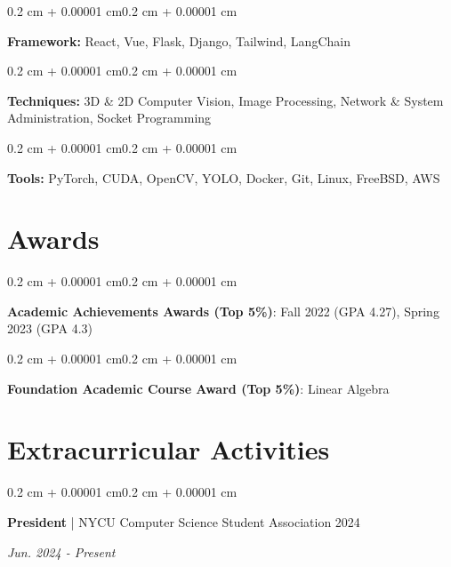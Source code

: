 \documentclass[10pt, letterpaper]{article}
\newenvironment{highlights}{
    \begin{itemize}[
        topsep=0.05 cm,
        parsep=0.05 cm,
        partopsep=0pt,
        itemsep=0pt,
        leftmargin=0.4 cm + 10pt
    ]
}{
    \end{itemize}
}
\newenvironment{onecolentry}{
    \begin{adjustwidth}{0.2 cm + 0.00001 cm}{0.2 cm + 0.00001 cm}
}{
    \end{adjustwidth}
}
\newenvironment{twocolentry}[2][]{
    \onecolentry
    \def\secondColumn{#2}
    \setcolumnwidth{\fill, 4.5 cm}
    \begin{paracol}{2}
}{
    \switchcolumn \raggedleft \secondColumn
    \end{paracol}
    \endonecolentry
}
\begin{document}
        \vspace{0.15 cm}
        \begin{onecolentry}
            \textbf{Framework:} React, Vue, Flask, Django, Tailwind, LangChain
        \end{onecolentry}
        
        \vspace{0.15 cm}
        \begin{onecolentry}
            \textbf{Techniques:} 3D \& 2D Computer Vision, Image Processing, Network \& System Administration, Socket Programming
        \end{onecolentry}

        \vspace{0.15 cm}
        \begin{onecolentry}
            \textbf{Tools:} PyTorch, CUDA, OpenCV, YOLO, Docker, Git, Linux, FreeBSD, AWS
        \end{onecolentry}

    \section{Awards}
        \begin{onecolentry}
            \textbf{Academic Achievements Awards (Top 5\%)}: Fall 2022 (GPA 4.27), Spring 2023 (GPA 4.3)
        \end{onecolentry}
        
        \vspace{0.15 cm}
        \begin{onecolentry}
            \textbf{Foundation Academic Course Award (Top 5\%)}: Linear Algebra
        \end{onecolentry}

    \section{Extracurricular Activities}

        \begin{twocolentry}{\textit{Jun. 2024 - Present}}
                \textbf{President} | NYCU Computer Science Student Association 2024
        \end{twocolentry}
        
\end{document}
